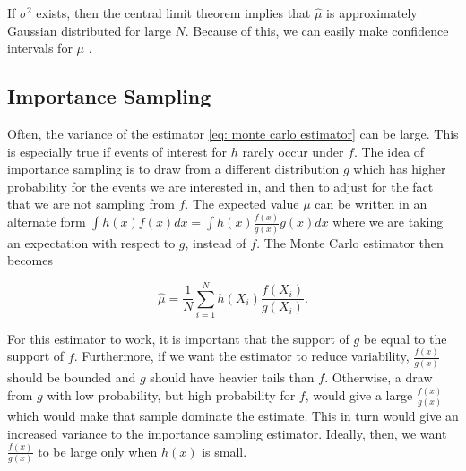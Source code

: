 If $\sigma^2$ exists, then the central limit theorem implies that $\hat{\mu}$ is approximately Gaussian distributed for large $N$. Because of this, we can easily make confidence intervals for $\mu$ \parencite{givens2013computational}.


\subsection{Importance Sampling}
\label{subsec: importance sampling theory}
Often, the variance of the estimator \eqref{eq: monte carlo estimator} can be large. This is especially true if events of interest for $h$ rarely occur under $f$. The idea of importance sampling is to draw from a different distribution $g$ which has higher probability for the events we are interested in, and then to adjust for the fact that we are not sampling from $f$. The expected value $\mu$ can be written in an alternate form $\int h(x)f(x)dx = \int h(x)\frac{f(x)}{g(x)}g(x) dx$ where we are taking an expectation with respect to $g$, instead of $f$. The Monte Carlo estimator then becomes

$$
    \hat{\mu} = \frac{1}{N} \sum_{i=1}^N h(X_i)\frac{f(X_i)}{g(X_i)}.
$$

For this estimator to work, it is important that the support of $g$ be equal to the support of $f$. Furthermore, if we want the estimator to reduce variability, $\frac{f(x)}{g(x)}$ should be bounded and $g$ should have heavier tails than $f$. Otherwise, a draw from $g$ with low probability, but high probability for $f$, would give a large $\frac{f(x)}{g(x)}$ which would make that sample dominate the estimate. This in turn would give an increased variance to the importance sampling estimator. Ideally, then, we want $\frac{f(x)}{g(x)}$ to be large only when $h(x)$ is small. \parencite{givens2013computational}






